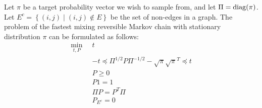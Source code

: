 \documentclass[12pt]{imsart}
\numberwithin{equation}{section}
\theoremstyle{plain}
\theoremstyle{remark}
\def\diag{\text{diag}}
\def\diag{\mathop{\rm diag}}
\begin{document}

\par


Let $\pi$ be a target probability vector we wish to sample from, and
let $\Pi = \diag(\pi)$.  Let $E^c = \left\{(i,j) \;|\; (i,j) \not\in
  E\right\}$ be the set of non-edges in a graph.
The problem of the fastest mixing reversible Markov chain with
stationary distribution $\pi$ can be formulated as follows:
\begin{align}
\min_{t,P}\;\; &  t \\
 & -t \preceq \Pi^{1/2} P \Pi^{-1/2} - \sqrt{\pi}\sqrt{\pi}^T \preceq
 t \\
& P \geq 0 \\
& P 1 = 1 \\
& \Pi P = P^T \Pi\\
& P_{E^c} = 0
\end{align}
\end{document}
